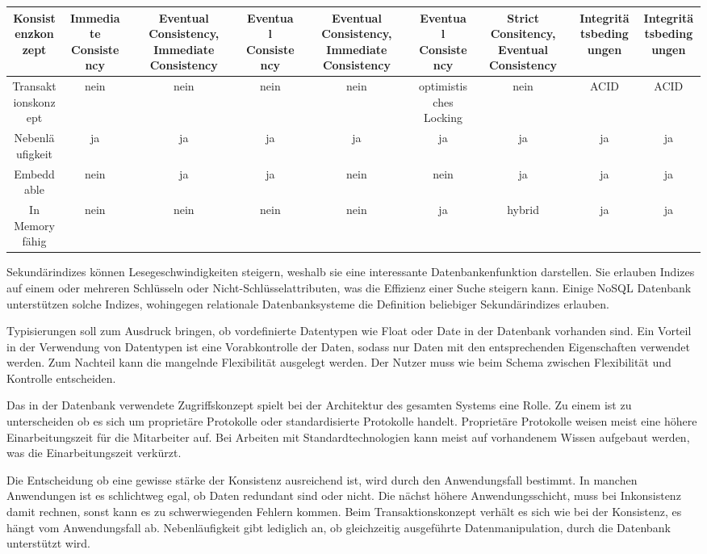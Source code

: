 \begin{table}[H]
\begin{tabulary} {\linewidth} {C | C | C | C | C | C | C | C | C}
\midrule
Konsistenzkonzept & Immediate Consistency & Eventual Consistency, Immediate Consistency & Eventual
Consistency & Eventual Consistency, Immediate Consistency & Eventual Consistency & Strict Consitency, Eventual Consistency &  Integritätsbedingungen & Integritätsbedingungen \\
\midrule
Transaktionskonzept & nein & nein & nein & nein & optimistisches Locking & nein & ACID & ACID \\
\midrule
Nebenläufigkeit & ja & ja & ja & ja & ja & ja & ja & ja \\
\midrule
Embeddable & nein & ja & ja & nein & nein & ja & ja & ja \\
\midrule
In Memory fähig & nein & nein & nein & nein & ja & hybrid & ja & ja \\
\bottomrule
\end{tabulary}
\end{table}

Sekundärindizes können Lesegeschwindigkeiten steigern, weshalb sie eine interessante Datenbankenfunktion darstellen. Sie erlauben Indizes auf einem oder mehreren Schlüsseln oder Nicht-Schlüsselattributen, was die Effizienz einer Suche steigern kann. Einige NoSQL Datenbank unterstützen solche Indizes, wohingegen relationale Datenbanksysteme die Definition beliebiger Sekundärindizes erlauben. 

Typisierungen soll zum Ausdruck bringen, ob vordefinierte Datentypen wie Float oder Date in der Datenbank vorhanden sind. Ein Vorteil in der Verwendung von Datentypen ist eine Vorabkontrolle der Daten, sodass nur Daten mit den entsprechenden Eigenschaften verwendet werden. Zum Nachteil kann die mangelnde Flexibilität ausgelegt werden. Der Nutzer muss wie beim Schema zwischen Flexibilität und Kontrolle entscheiden. 

Das in der Datenbank verwendete Zugriffskonzept spielt bei der Architektur des gesamten Systems eine Rolle. Zu einem ist zu unterscheiden ob es sich um proprietäre Protokolle oder standardisierte Protokolle handelt. Proprietäre Protokolle weisen meist eine höhere Einarbeitungszeit für die Mitarbeiter auf. Bei Arbeiten mit Standardtechnologien kann meist auf vorhandenem Wissen aufgebaut werden, was die Einarbeitungszeit verkürzt. 

Die Entscheidung ob eine gewisse stärke der Konsistenz ausreichend ist, wird durch den Anwendungsfall bestimmt. In manchen Anwendungen ist es schlichtweg egal, ob Daten redundant sind oder nicht. Die nächst höhere Anwendungsschicht, muss bei Inkonsistenz damit rechnen, sonst kann es zu schwerwiegenden Fehlern kommen. Beim Transaktionskonzept verhält es sich wie bei der Konsistenz, es hängt vom Anwendungsfall ab. Nebenläufigkeit gibt lediglich an, ob gleichzeitig ausgeführte Datenmanipulation, durch die Datenbank unterstützt wird.   

